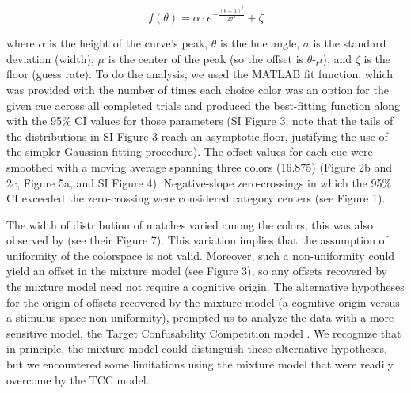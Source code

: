 \documentclass[9pt,biorxiv,lineno,onehalfspacing]{lapreprint}
\begin{document}
\begin{refsection}


\begin{equation} \label{eq:GaussianEquation}
    f(\theta) = {\alpha} \cdot e^{-\frac{(\theta-{\mu})^2}{2{\sigma}^2}} + {\zeta}        
\end{equation}



where $\alpha$ is the height of the curve's peak, $\theta$ is the hue angle, $\sigma$ is the standard deviation (width), $\mu$ is the center of the peak (so the offset is $\theta$-$\mu$), and $\zeta$ is the floor (guess rate). 
To do the analysis, we used the MATLAB fit function, which was provided with the number of times each choice color was an option for the given cue across all completed trials and produced the best-fitting function along with the 95\% CI values for those parameters (SI Figure 3; note that the tails of the distributions in SI Figure 3 reach an asymptotic floor, justifying the use of the simpler Gaussian fitting procedure). 
The offset values for each cue were smoothed with a moving average spanning three colors (16.875\degree{}) (Figure 2b and 2c, Figure 5a, and SI Figure 4). Negative-slope zero-crossings in which the 95\% CI exceeded the zero-crossing were considered category centers (see Figure 1).

The width of distribution of matches varied among the colors; this was also observed by \citet{bae_why_2015} (see their Figure 7). 
This variation implies that the assumption of uniformity of the colorspace is not valid. 
Moreover, such a non-uniformity could yield an offset in the mixture model (see Figure 3), so any offsets recovered by the mixture model need not require a cognitive origin.  
The alternative hypotheses for the origin of offsets recovered by the mixture model (a cognitive origin versus a stimulus-space non-uniformity), prompted us to analyze the data with a more sensitive model, the Target Confusability Competition model \citep{schurgin_psychophysical_2020}.
We recognize that in principle, the mixture model could distinguish these alternative hypotheses, but we encountered some limitations using the mixture model that were readily overcome by the TCC model. 


\end{refsection}
\end{document}
